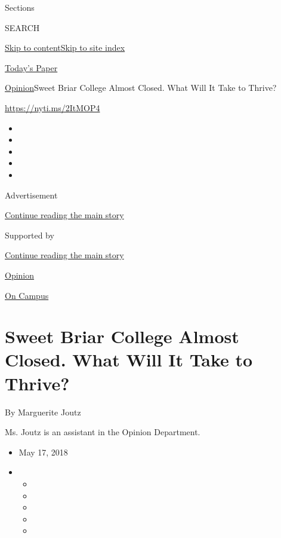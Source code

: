 Sections

SEARCH

\protect\hyperlink{site-content}{Skip to
content}\protect\hyperlink{site-index}{Skip to site index}

\href{https://myaccount.nytimes.com/auth/login?response_type=cookie\&client_id=vi}{}

\href{https://www.nytimes.com/section/todayspaper}{Today's Paper}

\href{/section/opinion}{Opinion}\textbar{}Sweet Briar College Almost
Closed. What Will It Take to Thrive?

\href{https://nyti.ms/2ItMOP4}{https://nyti.ms/2ItMOP4}

\begin{itemize}
\item
\item
\item
\item
\item
\end{itemize}

Advertisement

\protect\hyperlink{after-top}{Continue reading the main story}

Supported by

\protect\hyperlink{after-sponsor}{Continue reading the main story}

\href{/section/opinion}{Opinion}

\href{/column/on-campus}{On Campus}

\hypertarget{sweet-briar-college-almost-closed-what-will-it-take-to-thrive}{%
\section{Sweet Briar College Almost Closed. What Will It Take to
Thrive?}\label{sweet-briar-college-almost-closed-what-will-it-take-to-thrive}}

By Marguerite Joutz

Ms. Joutz is an assistant in the Opinion Department.

\begin{itemize}
\item
  May 17, 2018
\item
  \begin{itemize}
  \item
  \item
  \item
  \item
  \item
  \end{itemize}
\end{itemize}

